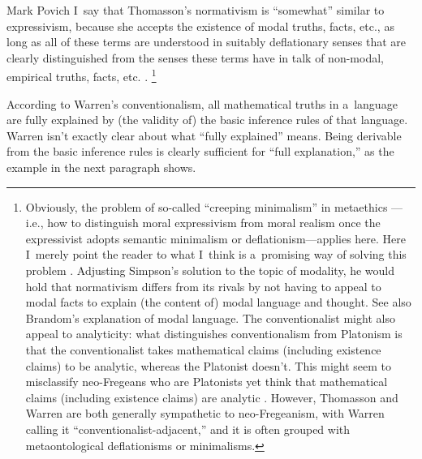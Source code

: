\begin{artengenv}{Mark Povich}
I~say that Thomasson's normativism is ``somewhat'' similar to expressivism, because she accepts the existence of modal truths, facts, etc., as long as all of these terms are understood in suitably deflationary senses that are clearly distinguished from the senses these terms have in talk of non-modal, empirical truths, facts, etc.
\parencites[][]{thomasson_norms_2020}[see also][]{baker_wittgenstein_2009}.%
\footnote{Obviously, the problem of so-called ``creeping minimalism'' in metaethics 
\parencite[][]{dreier_metaethics_2004}%
---i.e., how to distinguish moral expressivism from moral realism once the expressivist adopts semantic minimalism or deflationism---applies here. Here I~merely point the reader to what I~think is a~promising way of solving this problem 
\parencite[][]{simpson_creeping_2020}. %
 Adjusting Simpson's solution to the topic of modality, he would hold that normativism differs from its rivals by not having to appeal to modal facts to explain (the content of) modal language and thought. See also Brandom's 
\parencite*[][]{brandom_between_2008} %
 explanation of modal language. The conventionalist might also appeal to analyticity: what distinguishes conventionalism from Platonism is that the conventionalist takes mathematical claims (including existence claims) to be analytic, whereas the Platonist doesn't. This might seem to misclassify neo-Fregeans who are Platonists yet think that mathematical claims (including existence claims) are analytic 
\parencite[e.g.,][]{hale_reasons_2001}.
 However, Thomasson 
\parencite*[][]{thomasson_ontology_2014} %
 and Warren 
\parencite*[][]{warren_shadows_2020} %
 are both generally sympathetic to neo-Fregeanism, with Warren 
\parencite*[][pp.198, 203]{warren_shadows_2020} %
 calling it ``conventionalist-adjacent,'' and it is often grouped with metaontological deflationisms or minimalisms.}

According to Warren's
\parencite*[][]{warren_shadows_2020} %
 conventionalism, all mathematical truths in a~language are fully explained by (the validity of) the basic inference rules of that language. Warren isn't exactly clear about what ``fully explained'' means. Being derivable from the basic inference rules is clearly sufficient for ``full explanation,'' as the example in the next paragraph shows.


\end{artengenv}
